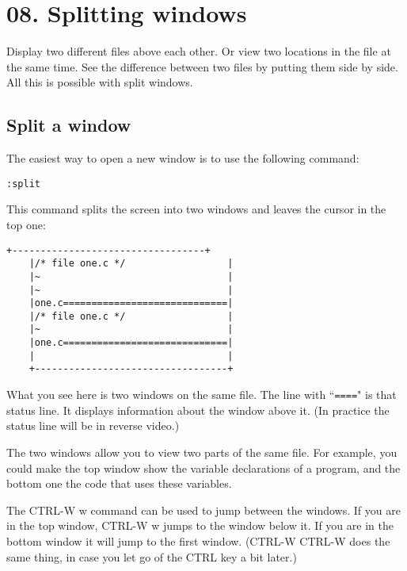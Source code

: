 \section{08. Splitting windows}
Display two different files above each other.
Or view two locations in the file at the same time.
See the difference between two files by putting them side by side.
All this is possible with split windows.
\localtableofcontents
\subsection{Split a window}

The easiest way to open a new window is to use the following command:

 \begin{Verbatim}[samepage=true]
 :split
 \end{Verbatim}

This command splits the screen into two windows and leaves the cursor in the top one:

\begin{Verbatim}[samepage=true]
    +----------------------------------+
    |/* file one.c */                  |
    |~                                 |
    |~                                 |
    |one.c=============================|
    |/* file one.c */                  |
    |~                                 |
    |one.c=============================|
    |                                  |
    +----------------------------------+
\end{Verbatim}

What you see here is two windows on the same file.
The line with ``\texttt{====}" is that status line.
It displays information about the window above it.
(In practice the status line will be in reverse video.)

The two windows allow you to view two parts of the same file.
For example, you could make the top window show the variable declarations of a program, and the bottom one the code that uses these variables.

The CTRL-W w command can be used to jump between the windows.
If you are in the top window, CTRL-W w jumps to the window below it.
If you are in the bottom window it will jump to the first window.
(CTRL-W CTRL-W does the same thing, in case you let go of the CTRL key a bit later.)

